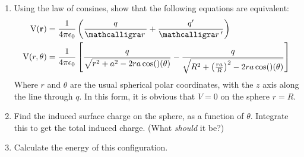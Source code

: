 \begin{hwkProblem}{3.8}{}

	\begin{enumerate}
		\item Using the law of consines, show that the following equations are equivalent:
			\begin{align}
				\func{V}[\vecb{r}] &= \frac{1}{4 \pi \epsilon_{0}} \left( \frac{q}{\rcurs} + \frac{q'}{\rcurs '} \right) \\
				\func{V}[r, \theta] &= \frac{1}{4 \pi \epsilon_{0}} \left[ \frac{q}{\sqrt{r^{2}+a^{2}-2ra\cos\left(\theta\right)}} - \frac{q}{\sqrt{R^{2}+{\left(\frac{ra}{R}\right)}^{2}-2ra\cos\left(\theta\right)}} \right]
			\end{align}
			Where \( r \) and \( \theta \) are the usual spherical polar coordinates, with the \( z \) axis along the line through \( q \). In this form, it is obvious that \( V = 0 \) on the sphere \( r = R \).
		\item Find the induced surface charge on the sphere, as a function of \( \theta \). Integrate this to get the total induced charge. (What \textit{should} it be?)
		\item Calculate the energy of this configuration.
	\end{enumerate}

	\hwkSol{}

\end{hwkProblem}
